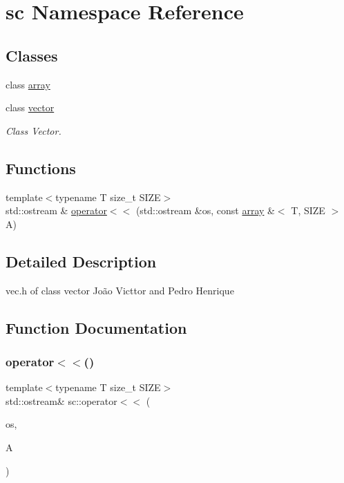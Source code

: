 \hypertarget{namespacesc}{}\section{sc Namespace Reference}
\label{namespacesc}
\subsection*{Classes}
\begin{DoxyCompactItemize}
\item 
class \hyperlink{classsc_1_1array}{array}
\item 
class \hyperlink{classsc_1_1vector}{vector}
\begin{DoxyCompactList}\small\item\em Class Vector. \end{DoxyCompactList}\end{DoxyCompactItemize}
\subsection*{Functions}
\begin{DoxyCompactItemize}
\item 
{\footnotesize template$<$typename T size\+\_\+t S\+I\+ZE$>$ }\\std\+::ostream \& \hyperlink{namespacesc_a994d8495814ae91272d54836cc508a1f}{operator$<$$<$} (std\+::ostream \&os, const \hyperlink{classsc_1_1array}{array} \&$<$ T, S\+I\+ZE $>$ A)
\end{DoxyCompactItemize}


\subsection{Detailed Description}
vec.\+h  of class vector  João Victtor and Pedro Henrique 

\subsection{Function Documentation}
\mbox{\label{namespacesc_a994d8495814ae91272d54836cc508a1f}} 
\subsubsection{\texorpdfstring{operator$<$$<$()}{operator<<()}}
{\footnotesize\ttfamily template$<$typename T size\+\_\+t S\+I\+ZE$>$ \\
std\+::ostream\& sc\+::operator$<$$<$ (\begin{DoxyParamCaption}\item[{std\+::ostream \&}]{os,  }\item[{const \hyperlink{classsc_1_1array}{array} \&$<$ T, S\+I\+ZE $>$}]{A }\end{DoxyParamCaption})}

